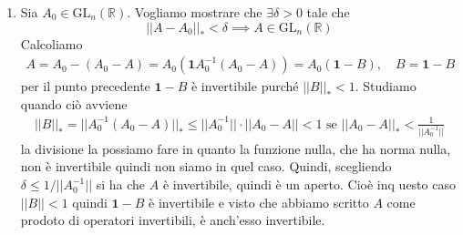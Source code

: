 \documentclass[a4paper]{article}
\begin{document}
{\begin{enumerate}
        Calcoliamo quindi \(||B \circ A||_*\)
        con \(A,B\) operatori lineari, e usando la norma operatoriale.
        Siccome abbiamo la norma operatoriale vale la stima fondamentale
        \begin{align*}
            ||(B\circ A) x|| &= ||B(Ax)|| \leq ||B||_* ||Ax|| \leq ||B||_* ||A||_* ||x||
        \end{align*}
        Siccome la norma operatoriale è la più piccola costante per cui vale una stima del tipo dato.
        Quindi \(||B \circ A||_* \leq ||B||_* ||A||_*\).
        Quindi in particolare \(||B^k||_* \leq {||B||_*}^k\).
        Tornando a prima otteniamo
        \begin{align*}
            \left|\left|
                \sum_{k=m}^{m+p} B^k
            \right|\right|_* \leq
            \sum_{k=m}^{m+p} ||B^k||_*
            \leq \sum_{k=m}^{m+p} {(||B||_*)}^k \leq \varepsilon
        \end{align*}
        pur di considerare \(||B||_* < 1\).
        \item Sia \(A_0 \in \text{GL}_n(\mathbb{R})\).
        Vogliamo mostrare che \(\exists \delta > 0\) tale che
        \[
            ||A-A_0||_* < \delta \implies A \in \text{GL}_n(\mathbb{R})
        \]
        Calcoliamo
        \begin{align*}
            A = A_0 - (A_0 - A) = A_0 (\mathbf{1}  A_0^{-1}(A_0 - A))
            = A_0 (\mathbf{1} - B), \quad B = \mathbf{1} - B
        \end{align*}
        per il punto precedente \(\mathbf{1} - B\) è invertibile purché \(||B||_* < 1\).
        Studiamo quando ciò avviene
        \begin{align*}
            ||B||_* = ||A_0^{-1}(A_0 - A)||_* \leq ||A_0^{-1}|| \cdot ||A_0 - A|| < 1
            \text{ se } ||A_0 - A||_* < \frac{1}{||A_0^{-1}||}
        \end{align*}
        la divisione la possiamo fare in quanto la funzione nulla, che ha norma nulla, non è invertibile quindi non siamo
        in quel caso.
        Quindi, scegliendo \(\delta \leq 1 / ||A_0^{-1}||\)
        si ha che \(A\) è invertibile, quindi è un aperto.
        Cioè inq uesto caso \(||B|| < 1\) quindi \(\mathbf{1} - B\) è invertibile
        e visto che abbiamo scritto \(A\) come prodoto di operatori invertibili, è anch'esso invertibile.
    \end{enumerate}

}
\end{document}
